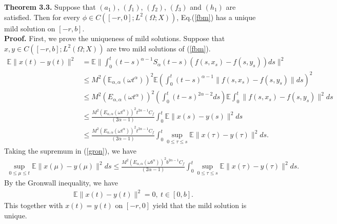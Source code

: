 \documentclass[12pt,a4paper,oneside,reqno,notitlepage]{amsart}
\theoremstyle{plain}
\numberwithin{equation}{section}
\begin{document}
\textbf{Theorem 3.3.} Suppose that $(a_{1})$, $(f_{1})$, $(f_{2})$, $(f_{3})$ and $(h_{1})$ are satisfied. Then for every $\phi \in C([-r,0];L^{2}(\Omega;X))$, Eq.(\ref{fbm}) has a unique mild solution on $[-r,b]$.\\
\textbf{Proof.} First, we prove the uniqueness of mild solutions. Suppose that $x,y\in C([-r,b];L^{2}(\Omega;X))$ are two mild solutions of (\ref{fbm}).
\begin{align}\label{gron}
\mathbb{E}\|x(t)-y(t)\|^{2}&=\mathbb{E}\|\int_{0}^{t}(t-s)^{\alpha-1}S_{\alpha}(t-s)(f(s,x_{s})-f(s,y_{s}))ds\|^{2}\nonumber\\
&\leq M^{2}(\mathbb{E}_{\alpha,\alpha}(\omega t^{\alpha}))^{2} \mathbb{E}\left(\int_{0}^{t}(t-s)^{\alpha-1}\|f(s,x_{s})-f(s,y_{s})\|ds\right)^{2}\nonumber\\
&\leq M^{2}(E_{\alpha,\alpha}(\omega t^{\alpha}))^{2} \left(\int_{0}^{t}(t-s)^{2\alpha-2}ds\right)\mathbb{E}\int_{0}^{t}\|f(s,x_{s})-f(s,y_{s})\|^{2}ds\nonumber\\
&\leq \frac{M^{2}(E_{\alpha,\alpha}(\omega t^{\alpha}))^{2}t^{2\alpha-1}C_{f}}{(2\alpha-1)}\int_{0}^{t}\mathbb{E}\|x(s)-y(s)\|^{2}ds\nonumber\\
&\leq \frac{M^{2}(E_{\alpha,\alpha}(\omega t^{\alpha}))^{2}t^{2\alpha-1}C_{f}}{(2\alpha-1)}\int_{0}^{t}\sup_{0\leq\tau\leq s}\mathbb{E}\|x(\tau)-y(\tau)\|^{2}ds.
\end{align}
Taking the supremum in (\ref{gron}), we have
\begin{align}\label{uni}
\sup_{0\leq \mu \leq t}\mathbb{E}\|x(\mu)-y(\mu)\|^{2}ds\leq \frac{M^{2}(E_{\alpha,\alpha}(\omega b^{\alpha}))^{2}b^{2\alpha-1}C_{f}}{(2\alpha-1)} \int_{0}^{t}\sup_{0\leq\tau\leq s}\mathbb{E}\|x(\tau)-y(\tau)\|^{2}ds.
\end{align}
By the Gronwall inequality, we have
\begin{align}
\mathbb{E}\|x(t)-y(t)\|^{2}=0,\ t\in[0,b].
\end{align}
This together with $x(t)=y(t)$ on $[-r,0]$ yield that the mild solution is unique.
\end{document}
